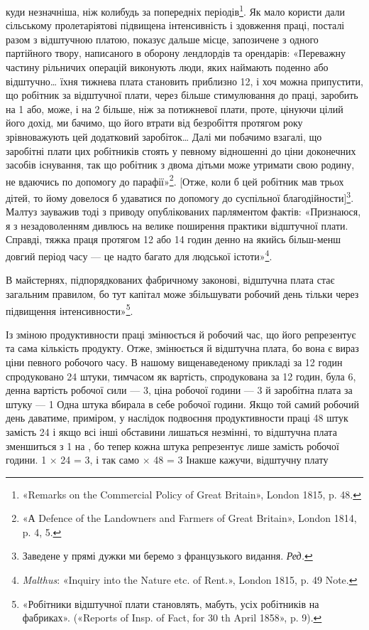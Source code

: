 \parcont{}  %
куди незначніша, ніж колибудь за попередніх періодів\footnote{
«Remarks on the Commercial Policy of Great Britain», London
1815, p. 48.
}. Як
мало користи дали сільському пролетаріятові підвищена інтенсивність
і здовження праці, посталі разом з відштучною платою,
показує дальше місце, запозичене з одного партійного твору,
написаного в оборону лендлордів та орендарів: «Переважну
частину рільничих операцій виконують люди, яких наймають
поденно або відштучно\dots{} їхня тижнева плата становить приблизно
12, і хоч можна припустити, що робітник за відштучної
плати, через більше стимулювання до праці, заробить на 1 або,
може, і на 2 більше, ніж за потижневої плати, проте,
цінуючи цілий його дохід, ми бачимо, що його втрати від безробіття
протягом року зрівноважують цей додатковий заробіток\dots{}
Далі ми побачимо взагалі, що заробітні плати цих робітників
стоять у певному відношенні до ціни доконечних засобів існування,
так що робітник з двома дітьми може утримати свою родину,
не вдаючись по допомогу до парафії»\footnote{
«А Defence of the Landowners and Farmers of Great Britain», London
1814, p. 4, 5.
}. [Отже, коли б цей
робітник мав трьох дітей, то йому довелося б удаватися по допомогу
до суспільної благодійности]\footnote*{
Заведене у прямі дужки ми беремо з французького видання. \emph{Ред.}
}. Малтуз зауважив тоді з
приводу опублікованих парляментом фактів: «Признаюся, я з
незадоволенням дивлюсь на велике поширення практики відштучної
плати. Справді, тяжка праця протягом 12 або 14 годин
денно на якийсь більш-менш довгий період часу — це надто багато
для людської істоти»\footnote{
\emph{Malthus}: «Inquiry into the Nature etc. of Rent.», London 1815,
p. 49 Note.
}.

В майстернях, підпорядкованих фабричному законові, відштучна
плата стає загальним правилом, бо тут капітал може збільшувати
робочий день тільки через підвищення інтенсивности»\footnote{
«Робітники відштучної плати становлять, мабуть,  усіх робітників
на фабриках». («Reports of Insp. of Fact, for 30 th April
1858», p. 9).
}.

Із зміною продуктивности праці змінюється й робочий час,
що його репрезентує та сама кількість продукту. Отже, змінюється
й відштучна плата, бо вона є вираз ціни певного робочого
часу. В нашому вищенаведеному прикладі за 12 годин спродуковано
24 штуки, тимчасом як вартість, спродукована за 12 годин,
була 6, денна вартість робочої сили — 3,
ціна робочої години — 3 й заробітна плата за штуку —
1 Одна штука вбирала в себе  робочої години. Якщо
той самий робочий день даватиме, приміром, у наслідок подвоєння
продуктивности праці 48 штук замість 24 і якщо всі інші
обставини лишаться незмінні, то відштучна плата зменшиться
з 1 на , бо тепер кожна штука репрезентує лише
 замість  робочої години. 1 × 24 = 3, і так
само  × 48 = 3 Інакше кажучи, відштучну плату
\parbreak{}  %

